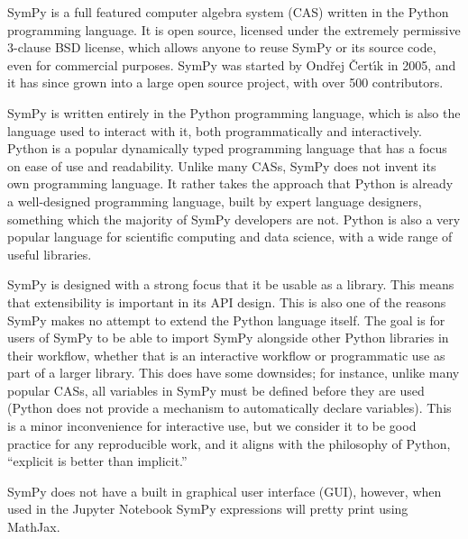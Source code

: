 SymPy is a full featured computer algebra system (CAS) written in the Python
programming language. It is open source, licensed under the extremely
permissive 3-clause BSD license, which allows anyone to reuse SymPy or its source code,
even for commercial purposes. SymPy was started by Ond\v{r}ej \v{C}ert\'{\i}k
in 2005, and it has since grown into a large open source project, with over
500 contributors.

SymPy is written entirely in the Python programming language,
which is also the language used to interact with it, both programmatically and
interactively. Python is a popular dynamically typed programming language that
has a focus on ease of use and readability. Unlike many CASs, SymPy does not
invent its own programming language. It rather takes the approach that Python
is already a well-designed programming language, built by expert language
designers, something which the majority of SymPy developers are not. Python is
also a very popular language for scientific computing and data science, with a
wide range of useful libraries.

SymPy is designed with a strong focus that it be usable as a library. This
means that extensibility is important in its API design. This is also one of
the reasons SymPy makes no attempt to extend the Python language itself. The
goal is for users of SymPy to be able to import SymPy alongside other Python
libraries in their workflow, whether that is an interactive workflow or
programmatic use as part of a larger library. This does have some downsides;
for instance, unlike many popular CASs, all variables in SymPy must be defined
before they are used (Python does not provide a mechanism to automatically
declare variables). This is a minor inconvenience for interactive use, but we
consider it to be good practice for any reproducible work, and it aligns with
the philosophy of Python, ``explicit is better than implicit.''

SymPy does not have a built in graphical user interface (GUI), however, when
used in the Jupyter Notebook
SymPy expressions will pretty print using MathJax.
